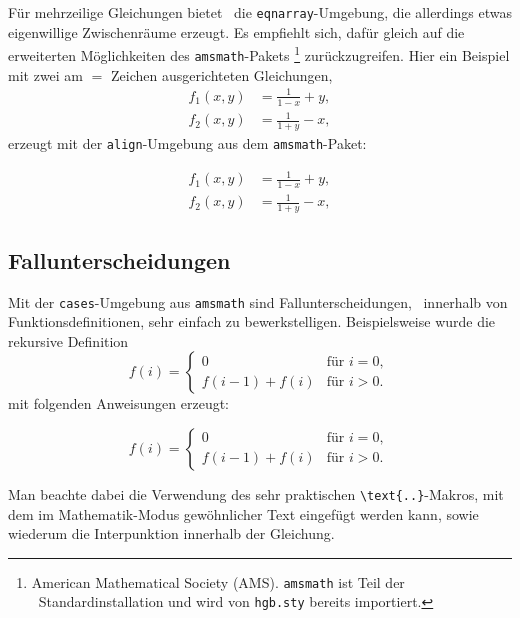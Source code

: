 Für mehrzeilige Gleichungen bietet \latex\ die 
\verb!eqnarray!-Umgebung, die allerdings etwas eigenwillige Zwischenräume erzeugt.
Es empfiehlt sich, dafür gleich auf die erweiterten Möglichkeiten des \texttt{amsmath}-Pakets%
\footnote{American Mathematical Society (AMS). \texttt{amsmath} ist Teil der \latex\ Standardinstallation und wird von \texttt{hgb.sty} bereits importiert.}
\cite{amsldoc02} zurückzugreifen.
Hier ein Beispiel mit zwei am $=$ Zeichen ausgerichteten Gleichungen,
%
\begin{align}
f_1 (x,y) &= \frac{1}{1-x} + y , \label{eq:f1} \\
f_2 (x,y) &= \frac{1}{1+y} - x , \label{eq:f2}
\end{align}
%
erzeugt mit der \texttt{align}-Umgebung aus dem \texttt{amsmath}-Paket:
%
\begin{LaTeXCode}[numbers=none]
\begin{align}
  f_1 (x,y) &= \frac{1}{1-x} + y , \label{eq:f1} \\
  f_2 (x,y) &= \frac{1}{1+y} - x , \label{eq:f2}
\end{align}
\end{LaTeXCode}


\subsection{Fallunterscheidungen}

Mit der \texttt{cases}-Umgebung aus \texttt{amsmath} sind Fallunterscheidungen, \ua\ innerhalb von Funktionsdefinitionen, sehr einfach zu bewerkstelligen. Beispielsweise wurde die rekursive Definition
%
\begin{equation}
	f(i) =
	\begin{cases}
	  0             & \text{für $i = 0$},\\
	  f(i-1) + f(i) & \text{für $i > 0$}.
	\end{cases}
\end{equation}
mit folgenden Anweisungen erzeugt:
%
\begin{LaTeXCode}[numbers=none]
\begin{equation}
	f(i) =
	\begin{cases}
	  0             & \text{für $i = 0$},\\
	  f(i-1) + f(i) & \text{für $i > 0$}.
	\end{cases}
\end{equation}
\end{LaTeXCode}
%
Man beachte dabei die Verwendung des sehr praktischen \verb!\text{..}!-Makros, mit dem im Mathematik-Modus gewöhnlicher Text eingefügt werden kann, sowie wiederum die Interpunktion innerhalb der Gleichung.

